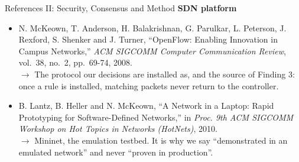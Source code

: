 \documentclass[aspectratio=169, 11pt]{beamer}
\begin{document}
\begin{frame}[allowframebreaks]{References II: Security, Consensus and Method}
    \vspace{3pt}
    \textbf{SDN platform}
    \begin{itemize}\itemsep1.5pt
        \item[{[8]}] N. McKeown, T. Anderson, H. Balakrishnan, G. Parulkar, L. Peterson, J. Rexford, S. Shenker and J. Turner, ``OpenFlow: Enabling Innovation in Campus Networks,'' \emph{ACM SIGCOMM Computer Communication Review}, vol.~38, no.~2, pp.~69-74, 2008.\\
          {\color{gray}$\rightarrow$ The protocol our decisions are installed as, and the source of Finding 3: once a rule is installed, matching packets never return to the controller.}
        \item[{[10]}] B. Lantz, B. Heller and N. McKeown, ``A Network in a Laptop: Rapid Prototyping for Software-Defined Networks,'' in \emph{Proc. 9th ACM SIGCOMM Workshop on Hot Topics in Networks (HotNets)}, 2010.\\
          {\color{gray}$\rightarrow$ Mininet, the emulation testbed. It is why we say ``demonstrated in an emulated network'' and never ``proven in production''.}
    \end{itemize}


\end{frame}
\end{document}
